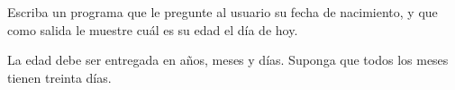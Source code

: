 Escriba un programa que le pregunte al usuario su fecha de nacimiento,
y que como salida le muestre cuál es su edad el día de hoy.

La edad debe ser entregada en años, meses y días.
Suponga que todos los meses tienen treinta días.

\begin{minipage}[t]{.48\textwidth}
  
\end{minipage}
\hfill
\begin{minipage}[t]{.48\textwidth}
  
\end{minipage}

\begin{minipage}[t]{.48\textwidth}
  
\end{minipage}
\hfill
\begin{minipage}[t]{.48\textwidth}
  
\end{minipage}


